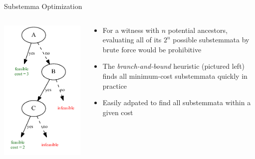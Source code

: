 \documentclass[10pt]{beamer}
\begin{document}
	\begin{frame}{Substemma Optimization}
		\begin{columns}
			\begin{column}{0.4\textwidth}
				\includegraphics[width=\textwidth]{../graphics/branch-and-bound-example.pdf}
			\end{column}
			\begin{column}{0.55\textwidth}
				\begin{itemize}
					\item For a witness with $n$ potential ancestors, evaluating all of its $2^n$ possible substemmata by brute force would be prohibitive
					\item The \emph{branch-and-bound} heuristic (pictured left) finds all minimum-cost substemmata quickly in practice
					\item Easily adpated to find all substemmata within a given cost
				\end{itemize}
			\end{column}
		\end{columns}
	\end{frame}
\end{document}
